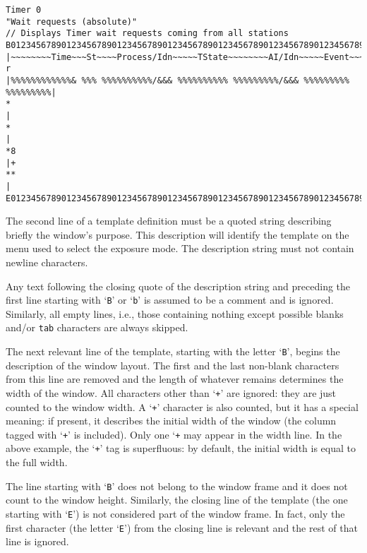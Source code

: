 {\small
\begin{verbatim}
Timer 0
"Wait requests (absolute)"
// Displays Timer wait requests coming from all stations
B0123456789012345678901234567890123456789012345678901234567890123456789012345+B
|~~~~~~~~Time~~~St~~~~Process/Idn~~~~~TState~~~~~~~~AI/Idn~~~~~Event~~~~~State| r
|%%%%%%%%%%%%& %%% %%%%%%%%%%/&&& %%%%%%%%%% %%%%%%%%%/&&& %%%%%%%%% %%%%%%%%%|
*                                                                             |
*                                                                             | 
*8                                                                            |+
**                                                                            |
E01234567890123456789012345678901234567890123456789012345678901234567890123456E
\end{verbatim}}

The second line of a template definition must be a quoted string describing
briefly the window's purpose.
This description will identify the template on the menu used to 
select the exposure mode.
The description string must not contain newline characters.

Any text following the closing quote of the
description string and preceding the first
line starting with `{\tt B}' or `{\tt b}' is
assumed to be a comment and is ignored.
Similarly, all empty lines, i.e.,
those containing nothing except possible blanks and/or {\tt tab} characters
are always skipped.

The next relevant
line of the template,
starting with the letter `{\tt B}', begins the description of the window layout.
The first and the last non-blank characters from this line are removed and the
length of whatever remains determines the width of the window.
All characters other than `{\tt +}'
are ignored: they are just counted to the window width.
A `{\tt +}' character is also counted, but it has a
special meaning: if present, it describes the initial width of the window
(the column tagged with `{\tt +}' is included).
Only one `{\tt +} may appear in the width line.
In the above example, the `{\tt +}' tag is superfluous: by default, the
initial width is equal to the full width.

The line starting with `{\tt B}' does not belong to the window frame and
it does not count to the window height.
Similarly, the closing line of the template (the one starting with `{\tt E}')
is not considered part of the window frame.
In fact, only the first character (the letter `{\tt E}') from the closing
line is relevant and the rest of that line is ignored.

